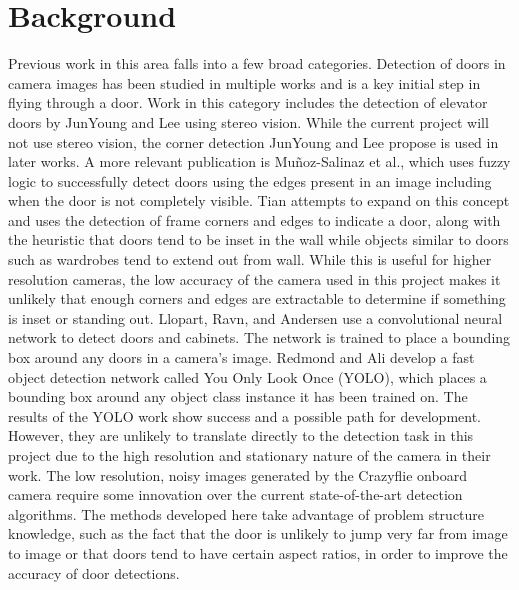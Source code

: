 \documentclass[12pt]{article}
\begin{document}
\section{Background}
Previous work in this area falls into a few broad categories. Detection of doors in camera images has been studied in multiple works and is a key initial step in flying through a door. Work in this category includes the detection of elevator doors by JunYoung and Lee \cite{ElevatorDoors} using stereo vision. While the current project will not use stereo vision, the corner detection JunYoung and Lee propose is used in later works. A more relevant publication is Mu\~noz-Salinaz et al.\cite{Fuzzy}, which uses fuzzy logic to successfully detect doors using the edges present in an image including when the door is not completely visible. Tian \cite{Tian2013} attempts to expand on this concept and uses the detection of frame corners and edges to indicate a door, along with the heuristic that doors tend to be inset in the wall while objects similar to doors such as wardrobes tend to extend out from wall. While this is useful for higher resolution cameras, the low accuracy of the camera used in this project makes it unlikely that enough corners and edges are extractable to determine if something is inset or standing out. Llopart, Ravn, and Andersen\cite{NNDoor} use a convolutional neural network to detect doors and cabinets. The network is trained to place a bounding box around any doors in a camera's image. Redmond and Ali \cite{yolov3} develop a fast object detection network called You Only Look Once (YOLO), which places a bounding box around any object class instance it has been trained on. The results of the YOLO work show success and a possible path for development. However, they are unlikely to translate directly to the detection task in this project due to the high resolution and stationary nature of the camera in their work. The low resolution, noisy images generated by the Crazyflie onboard camera require some innovation over the current state-of-the-art detection algorithms. The methods developed here take advantage of problem structure knowledge, such as the fact that the door is unlikely to jump very far from image to image or that doors tend to have certain aspect ratios, in order to improve the accuracy of door detections. 
\end{document}

